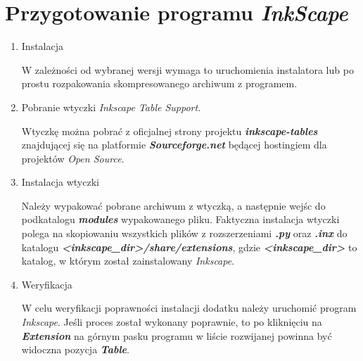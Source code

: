 \documentclass[11pt,a4paper]{article}
\begin{document}
\section{Przygotowanie programu \emph{InkScape}} \label{app:inkscape}
\begin{enumerate}
\item Instalacja

W zależności od wybranej wersji wymaga to uruchomienia instalatora lub po prostu rozpakowania skompresowanego archiwum z programem.

\item Pobranie wtyczki \emph{Inkscape Table Support}.

Wtyczkę można pobrać z oficjalnej strony projektu \emph{\textbf{inkscape-tables}} znajdującej się na platformie \emph{\textbf{Sourceforge.net}} będącej hostingiem dla projektów \emph{Open Source}.

\item Instalacja wtyczki

Należy wypakować pobrane archiwum z wtyczką, a następnie wejśc do podkatalogu \emph{\textbf{modules}} wypakowanego pliku. Faktyczna instalacja wtyczki polega na skopiowaniu wszystkich plików z rozszerzeniami \emph{\textbf{.py}} oraz \emph{\textbf{.inx}} do katalogu \emph{\textbf{\textless inkscape\_dir\textgreater /share/extensions}}, gdzie \emph{\textbf{\textless inkscape\_dir\textgreater}} to katalog, w którym został zainstalowany \emph{Inkscape}.

\item Weryfikacja

W celu weryfikacji poprawności instalacji dodatku należy uruchomić program \emph{Inkscape}. Jeśli proces został wykonany poprawnie, to po kliknięciu na \emph{\textbf{Extension}} na górnym pasku programu w liście rozwijanej powinna być widoczna pozycja \emph{\textbf{Table}}.

\newpage
\end{enumerate}

\end{document}
